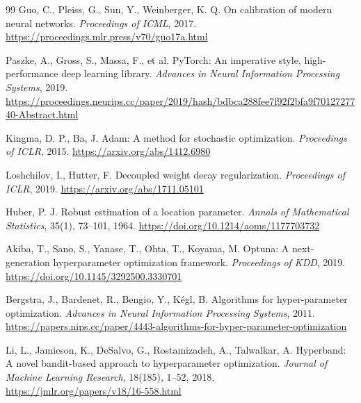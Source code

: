 \documentclass[11pt]{article}
\theoremstyle{definition}
\begin{document}
\begin{thebibliography}{99}
 Guo, C., Pleiss, G., Sun, Y., Weinberger, K. Q. On calibration of modern neural networks. \textit{Proceedings of ICML}, 2017. \url{https://proceedings.mlr.press/v70/guo17a.html}

 Paszke, A., Gross, S., Massa, F., et al. PyTorch: An imperative style, high-performance deep learning library. \textit{Advances in Neural Information Processing Systems}, 2019. \url{https://proceedings.neurips.cc/paper/2019/hash/bdbca288fee7f92f2bfa9f7012727740-Abstract.html}

 Kingma, D. P., Ba, J. Adam: A method for stochastic optimization. \textit{Proceedings of ICLR}, 2015. \url{https://arxiv.org/abs/1412.6980}

 Loshchilov, I., Hutter, F. Decoupled weight decay regularization. \textit{Proceedings of ICLR}, 2019. \url{https://arxiv.org/abs/1711.05101}

 Huber, P. J. Robust estimation of a location parameter. \textit{Annals of Mathematical Statistics}, 35(1), 73--101, 1964. \url{https://doi.org/10.1214/aoms/1177703732}

 Akiba, T., Sano, S., Yanase, T., Ohta, T., Koyama, M. Optuna: A next-generation hyperparameter optimization framework. \textit{Proceedings of KDD}, 2019. \url{https://doi.org/10.1145/3292500.3330701}

 Bergstra, J., Bardenet, R., Bengio, Y., Kégl, B. Algorithms for hyper-parameter optimization. \textit{Advances in Neural Information Processing Systems}, 2011. \url{https://papers.nips.cc/paper/4443-algorithms-for-hyper-parameter-optimization}

 Li, L., Jamieson, K., DeSalvo, G., Rostamizadeh, A., Talwalkar, A. Hyperband: A novel bandit-based approach to hyperparameter optimization. \textit{Journal of Machine Learning Research}, 18(185), 1--52, 2018. \url{https://jmlr.org/papers/v18/16-558.html}


\end{thebibliography}
\end{document}
